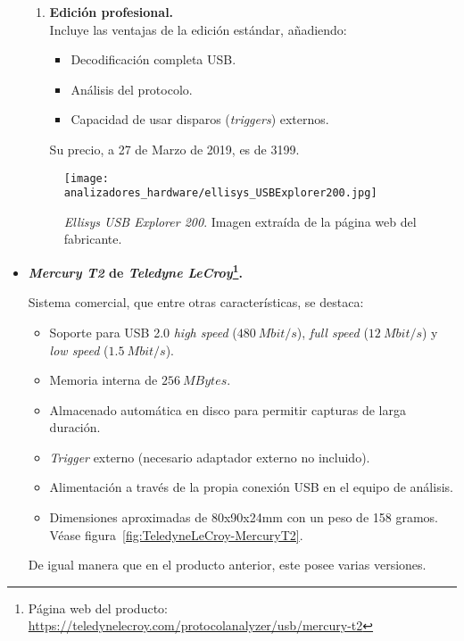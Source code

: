 \begin{itemize}
\begin{enumerate}
        \item \textbf{Edición profesional.} \\
        Incluye las ventajas de la edición estándar, añadiendo:
        \begin{itemize}
            \item Decodificación completa USB.
            \item Análisis del protocolo.
            \item Capacidad de usar disparos (\emph{triggers}) externos.
        \end{itemize}
        Su precio, a 27 de Marzo de 2019, es de 3199\texteuro.
    \end{enumerate}    
    \begin{figure}[htb]
        \centering
        \texttt{[image: analizadores\_hardware/ellisys\_USBExplorer200.jpg]}
        \caption{\emph{Ellisys USB Explorer 200}. Imagen extraída de la página web del fabricante.}
        \label{fig:ellisys-Explorer200}
    \end{figure}
    
    \item \textbf{\emph{Mercury T2} de \emph{Teledyne LeCroy}\footnote{Página web del producto: \url{https://teledynelecroy.com/protocolanalyzer/usb/mercury-t2}}.}
    
    Sistema comercial, que entre otras características\cite{teledynelecroy2014}, se destaca:
    \begin{itemize}
        \item Soporte para USB 2.0 \emph{high speed} ($480~Mbit/s$), \emph{full speed} ($12~Mbit/s$) y \emph{low speed} ($1.5~Mbit/s$).
        \item Memoria interna de $256~MBytes$.
        \item Almacenado automática en disco para permitir capturas de larga duración.
        \item \emph{Trigger} externo (necesario adaptador externo no incluido).
        \item Alimentación a través de la propia conexión USB en el equipo de análisis.
        \item Dimensiones aproximadas de 80x90x24mm con un peso de 158 gramos. Véase figura~\ref{fig:TeledyneLeCroy-MercuryT2}.
    \end{itemize}
    
    De igual manera que en el producto anterior, este posee varias versiones.


\end{itemize}
